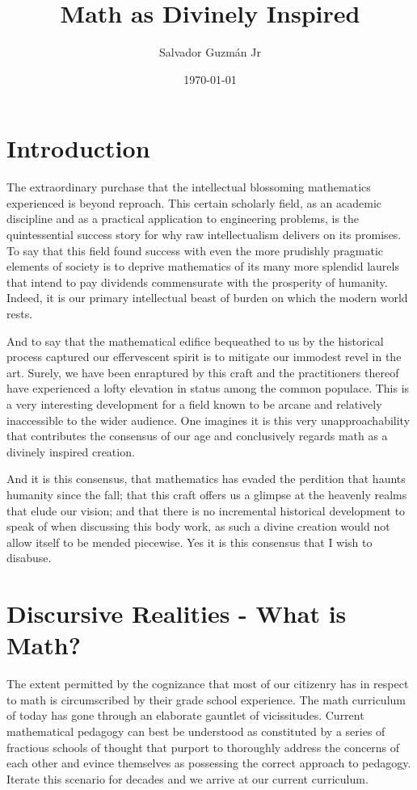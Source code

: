 \documentclass{article}
\begin{document}
	
	\title{\Large{\textbf{Math as Divinely Inspired}}}
	
	\author{Salvador Guzm\'{a}n Jr}
	\date{\today}
	\maketitle
	
	\pagebreak
	\pagebreak
	\tableofcontents
	\pagebreak
	
	\section{Introduction}
	The extraordinary purchase that the intellectual blossoming mathematics experienced is beyond reproach. This certain scholarly field, as an academic discipline and as a practical application to engineering problems, is the quintessential success story for why raw intellectualism delivers on its promises. To say that this field found success with even the more prudishly pragmatic elements of society is to deprive mathematics of its many more splendid laurels that intend to pay dividends commensurate with the prosperity of humanity. Indeed, it is our primary intellectual beast of burden on which the modern world rests.
	
	And to say that the mathematical edifice bequeathed to us by the historical process captured our effervescent spirit is to mitigate our immodest revel in the art. Surely, we have been enraptured by this craft and the practitioners thereof have experienced a lofty elevation in status among the common populace. This is a very interesting development for a field known to be arcane and relatively inaccessible to the wider audience. One imagines it is this very unapproachability that contributes the consensus of our age and conclusively regards math as a divinely inspired creation.
	
	And it is this consensus, that mathematics has evaded the perdition that haunts humanity since the fall; that this craft offers us a glimpse at the heavenly realms that elude our vision; and that there is no incremental historical development to speak of when discussing this body work, as such a divine creation would not allow itself to be mended piecewise. Yes it is this consensus that I wish to disabuse.
	
	\section{Discursive Realities - What is Math?}
	The extent permitted by the cognizance that most of our citizenry has in respect to math is circumscribed by their grade school experience. The math curriculum of today has gone through an elaborate gauntlet of vicissitudes. Current mathematical pedagogy can best be understood as constituted by a series of fractious schools of thought that purport to thoroughly address the concerns of each other and evince themselves as possessing the correct approach to pedagogy. Iterate this scenario for decades and we arrive at our current curriculum.
	
\end{document}
